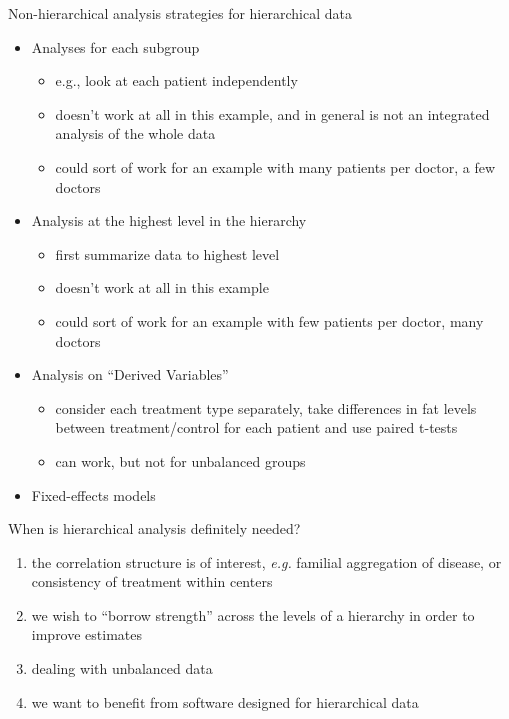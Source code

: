 \documentclass[
  ignorenonframetext,
]{beamer}
\providecommand{\tightlist}{%
  \setlength{\itemsep}{0pt}\setlength{\parskip}{0pt}}
\begin{document}
\begin{frame}{Non-hierarchical analysis strategies for hierarchical
data}
\protect\hypertarget{non-hierarchical-analysis-strategies-for-hierarchical-data}{}

\begin{itemize}
\tightlist
\item
  Analyses for each subgroup

  \begin{itemize}
  \tightlist
  \item
    e.g., look at each patient independently
  \item
    doesn't work at all in this example, and in general is not an
    integrated analysis of the whole data
  \item
    could sort of work for an example with many patients per doctor, a
    few doctors
  \end{itemize}
\item
  Analysis at the highest level in the hierarchy

  \begin{itemize}
  \tightlist
  \item
    first summarize data to highest level
  \item
    doesn't work at all in this example
  \item
    could sort of work for an example with few patients per doctor, many
    doctors
  \end{itemize}
\item
  Analysis on ``Derived Variables''

  \begin{itemize}
  \tightlist
  \item
    consider each treatment type separately, take differences in fat
    levels between treatment/control for each patient and use paired
    t-tests
  \item
    can work, but not for unbalanced groups
  \end{itemize}
\item
  Fixed-effects models
\end{itemize}

\end{frame}

\begin{frame}{When is hierarchical analysis definitely needed?}
\protect\hypertarget{when-is-hierarchical-analysis-definitely-needed}{}

\begin{enumerate}
\tightlist
\item
  the correlation structure is of interest, \emph{e.g.} familial
  aggregation of disease, or consistency of treatment within centers
\item
  we wish to ``borrow strength'' across the levels of a hierarchy in
  order to improve estimates
\item
  dealing with unbalanced data
\item
  we want to benefit from software designed for hierarchical data
\end{enumerate}

\end{frame}
\end{document}
